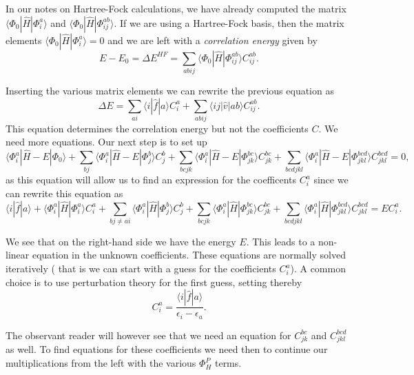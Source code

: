 \documentclass[%
oneside,                 %
final,                   %
10pt]{article}
\begin{document}
In our notes on Hartree-Fock calculations, 
we have already computed the matrix $\langle \Phi_0 | \hat{H}|\Phi_{i}^{a}\rangle $ and $\langle \Phi_0 | \hat{H}|\Phi_{ij}^{ab}\rangle$.  If we are using a Hartree-Fock basis, then the matrix elements
$\langle \Phi_0 | \hat{H}|\Phi_{i}^{a}\rangle=0$ and we are left with a \emph{correlation energy} given by
\[
E-E_0 =\Delta E^{HF}=\sum_{abij}\langle \Phi_0 | \hat{H}|\Phi_{ij}^{ab} \rangle C_{ij}^{ab}. 
\]


Inserting the various matrix elements we can rewrite the previous equation as
\[
\Delta E=\sum_{ai}\langle i| \hat{f}|a \rangle C_{i}^{a}+
\sum_{abij}\langle ij | \hat{v}| ab \rangle C_{ij}^{ab}.
\]
This equation determines the correlation energy but not the coefficients $C$. 
We need more equations. Our next step is to set up
\[
\langle \Phi_i^a | \hat{H} -E| \Phi_0\rangle + \sum_{bj}\langle \Phi_i^a | \hat{H} -E|\Phi_{j}^{b} \rangle C_{j}^{b}+
\sum_{bcjk}\langle \Phi_i^a | \hat{H} -E|\Phi_{jk}^{bc} \rangle C_{jk}^{bc}+
\sum_{bcdjkl}\langle \Phi_i^a | \hat{H} -E|\Phi_{jkl}^{bcd} \rangle C_{jkl}^{bcd}=0,
\]
as this equation will allow us to find an expression for the coefficents $C_i^a$ since we can rewrite this equation as 
\[
\langle i | \hat{f}| a\rangle +\langle \Phi_i^a | \hat{H}|\Phi_{i}^{a} \rangle C_{i}^{a}+ \sum_{bj\ne ai}\langle \Phi_i^a | \hat{H}|\Phi_{j}^{b} \rangle C_{j}^{b}+
\sum_{bcjk}\langle \Phi_i^a | \hat{H}|\Phi_{jk}^{bc} \rangle C_{jk}^{bc}+
\sum_{bcdjkl}\langle \Phi_i^a | \hat{H}|\Phi_{jkl}^{bcd} \rangle C_{jkl}^{bcd}=EC_i^a.
\]

We see that on the right-hand side we have the energy $E$. This leads to a non-linear equation in the unknown coefficients. 
These equations are normally solved iteratively ( that is we can start with a guess for the coefficients $C_i^a$). A common choice is to use perturbation theory for the first guess, setting thereby
\[
 C_{i}^{a}=\frac{\langle i | \hat{f}| a\rangle}{\epsilon_i-\epsilon_a}.
\]

The observant reader will however see that we need an equation for $C_{jk}^{bc}$ and $C_{jkl}^{bcd}$ as well.
To find equations for these coefficients we need then to continue our multiplications from the left with the various
$\Phi_{H}^P$ terms. 
\end{document}
